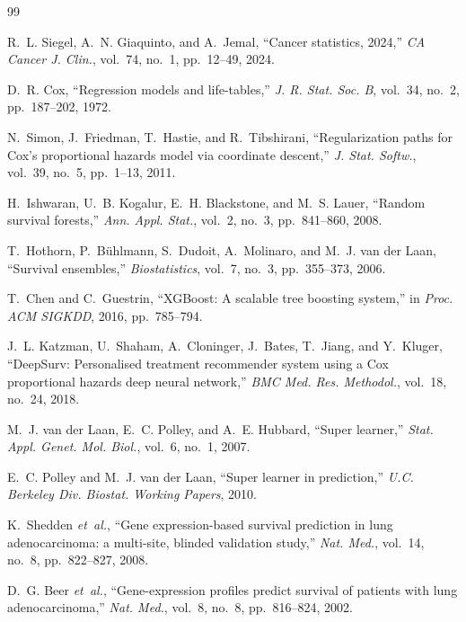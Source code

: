 \documentclass[journal]{IEEEtran}
\begin{document}
\begin{thebibliography}{99}

R.~L. Siegel, A.~N. Giaquinto, and A.~Jemal,
``Cancer statistics, 2024,''
\textit{CA Cancer J. Clin.}, vol.~74, no.~1, pp.~12--49, 2024.

D.~R. Cox, ``Regression models and life-tables,''
\textit{J. R. Stat. Soc. B}, vol.~34, no.~2, pp.~187--202, 1972.

N.~Simon, J.~Friedman, T.~Hastie, and R.~Tibshirani,
``Regularization paths for Cox's proportional hazards model via coordinate descent,''
\textit{J. Stat. Softw.}, vol.~39, no.~5, pp.~1--13, 2011.

H.~Ishwaran, U.~B. Kogalur, E.~H. Blackstone, and M.~S. Lauer,
``Random survival forests,''
\textit{Ann. Appl. Stat.}, vol.~2, no.~3, pp.~841--860, 2008.

T.~Hothorn, P.~B\"uhlmann, S.~Dudoit, A.~Molinaro, and M.~J. van der Laan,
``Survival ensembles,''
\textit{Biostatistics}, vol.~7, no.~3, pp.~355--373, 2006.

T.~Chen and C.~Guestrin,
``XGBoost: A scalable tree boosting system,''
in \textit{Proc. ACM SIGKDD}, 2016, pp.~785--794.

J.~L. Katzman, U.~Shaham, A.~Cloninger, J.~Bates, T.~Jiang, and Y.~Kluger,
``DeepSurv: Personalised treatment recommender system using a Cox proportional hazards deep neural network,''
\textit{BMC Med. Res. Methodol.}, vol.~18, no.~24, 2018.

M.~J. van der Laan, E.~C. Polley, and A.~E. Hubbard,
``Super learner,''
\textit{Stat. Appl. Genet. Mol. Biol.}, vol.~6, no.~1, 2007.

E.~C. Polley and M.~J. van der Laan,
``Super learner in prediction,''
\textit{U.C. Berkeley Div. Biostat. Working Papers}, 2010.

K.~Shedden \textit{et~al.},
``Gene expression-based survival prediction in lung adenocarcinoma: a multi-site, blinded validation study,''
\textit{Nat. Med.}, vol.~14, no.~8, pp.~822--827, 2008.

D.~G. Beer \textit{et~al.},
``Gene-expression profiles predict survival of patients with lung adenocarcinoma,''
\textit{Nat. Med.}, vol.~8, no.~8, pp.~816--824, 2002.


\end{thebibliography}
\end{document}
